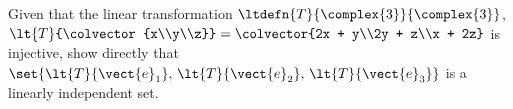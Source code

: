 Given that the linear transformation $\ltdefn{T}{\complex{3}}{\complex{3}}$, 
$\lt{T}{\colvector{x\\y\\z}} = \colvector{2x + y\\2y + z\\x + 2z}$ 
is injective, show directly that 
$\set{
\lt{T}{\vect{e}_1},\,
\lt{T}{\vect{e}_2},\,
\lt{T}{\vect{e}_3}
}$ 
is a linearly independent set.
